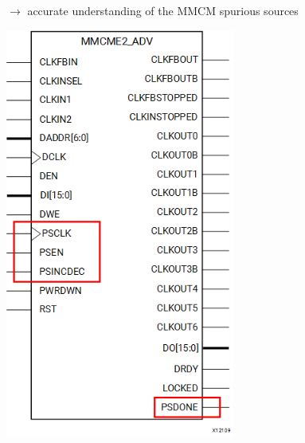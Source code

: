 \documentclass[compress,10pt,aspectratio=169]{beamer}
\begin{document}
\begin{frame}[fragile]
\begin{minipage}{.74\linewidth}
$\rightarrow$ accurate understanding of the MMCM spurious sources
\end{minipage}
\begin{minipage}{.25\linewidth}
\includegraphics[width=\linewidth]{mmcm.png}
\end{minipage}
\end{frame}
\end{document}
